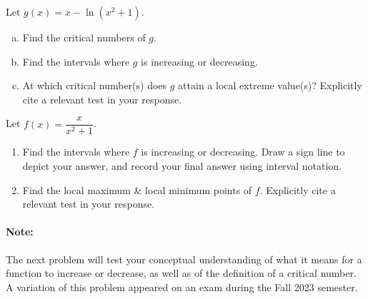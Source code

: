 \documentclass[10pt]{article}
\begin{document}


{} Let $g(x)=x-\ln(x^2+1)$.
%
\begin{enumerate}[(a)]
\item Find the critical numbers of $g$.

\vfill

\item Find the intervals where $g$ is increasing or decreasing.

\vfill
\vfill

\item At which critical number(s) does $g$ attain a local extreme value(s)? Explicitly cite a relevant test in your response.

\vfill

\end{enumerate}

\newpage

{} Let $f(x)=\dfrac{x}{x^2+1}$.
\begin{enumerate}
\item[(a)]Find the intervals where $f$ is increasing or decreasing. Draw a sign line to depict your answer, and record your final answer using interval notation. \\

\vfill
\vfill
\vfill


\item[(b)]Find the local maximum \& local minimum points of $f$. Explicitly cite a relevant test in your response. \\

\vfill
\vfill

\end{enumerate}

\newpage

\paragraph*{Note:} The next problem will test your conceptual understanding of what it means for a function to increase or decrease, as well as of the definition of a critical number. A variation of this problem appeared on an exam during the Fall 2023 semester.\\
\end{document}

